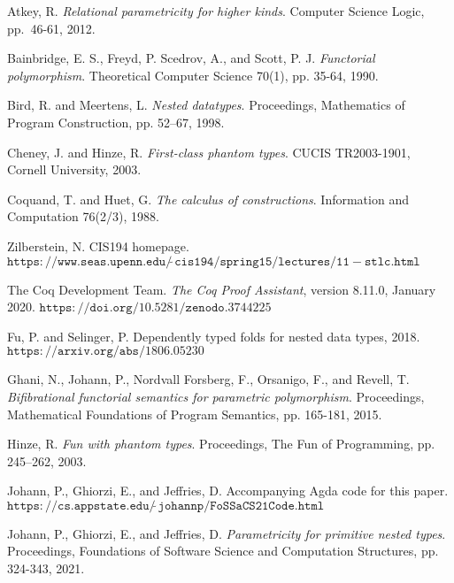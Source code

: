 \documentclass[9pt]{entcs}
\begin{document}
\begin{thebibliography}{10}\label{bibliography}

 Atkey, R.  {\em Relational parametricity for higher
  kinds}.  Computer Science Logic, pp.~46-61, 2012.

 Bainbridge, E. S., Freyd, P. Scedrov, A., and Scott,
  P. J. {\em Functorial polymorphism}. Theoretical Computer Science
  70(1), pp. 35-64, 1990.

 Bird, R. and Meertens, L. {\em Nested
  datatypes}. Proceedings, Mathematics of Program Construction,
  pp. 52–67, 1998.

 Cheney, J. and Hinze, R. {\em First-class phantom
 types}. CUCIS TR2003-1901, Cornell University, 2003.

 Coquand, T. and Huet, G. {\em The calculus of
  constructions}. Information and Computation 76(2/3), 1988.

Zilberstein, N. CIS194 homepage.
$\mathtt{https://www.seas.upenn.edu/\tilde~cis194/spring15/lectures/11\!\!-\!\!stlc.html}$
  

 The Coq Development Team. {\em The Coq Proof
  Assistant}, version 8.11.0, January 2020.
  $\mathtt{https://doi.org/10.5281/zenodo.3744225}$

 Fu, P. and Selinger, P.  Dependently typed folds for
  nested data types, 2018. $\mathtt{https://arxiv.org/abs/1806.05230}$ 
  
 Ghani, N., Johann, P., Nordvall Forsberg, F.,
  Orsanigo, F., and Revell, T. {\em Bifibrational functorial semantics
    for parametric polymorphism}. Proceedings, Mathematical
  Foundations of Program Semantics, pp. 165-181, 2015.

 Hinze, R. {\em Fun with phantom types}. Proceedings,
 The Fun of Programming, pp. 245–262, 2003.

 Johann, P., Ghiorzi, E., and Jeffries,
  D. Accompanying Agda code for this paper.
    $\mathtt{https://cs.appstate.edu/\tilde~johannp/FoSSaCS21Code.html}$
 
 Johann, P., Ghiorzi, E., and Jeffries, D. {\em
  Parametricity for primitive nested types}. Proceedings, Foundations
  of Software Science and Computation Structures, pp. 324-343, 2021.


\end{thebibliography}
\end{document}
